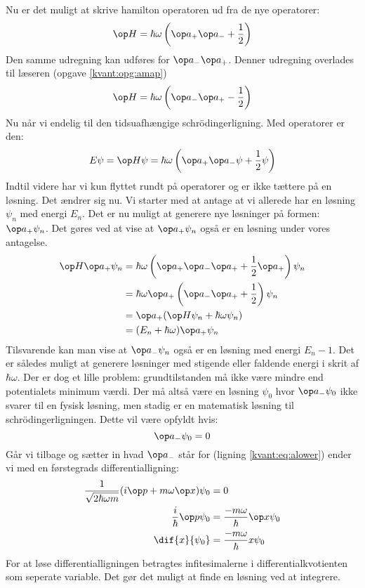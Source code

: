 Nu er det muligt at skrive hamilton operatoren ud fra de nye operatorer:
$$
\op H = \hbar \omega\left(\op a_+\op a_-+\frac{1}{2}\right)
$$
Den samme udregning kan udføres for $\op a_- \op a_+$. Denner udregning overlades til læseren (opgave \ref{kvant:opg:amap})
\begin{equation}
\op H = \hbar \omega\left(\op a_-\op a_+ -\frac{1}{2}\right)
\label{kvant:eq:Hamap}
\end{equation}
Nu når vi endelig til den tidsuafhængige schrödingerligning. Med operatorer er den:
$$
E\psi = \op H \psi = \hbar\omega \left(\op a_+\op a_-\psi+\frac{1}{2}\psi\right)
$$
Indtil videre har vi kun flyttet rundt på operatorer og er ikke tættere på en løsning. Det ændrer sig nu. Vi starter med at antage at vi allerede har en løsning $\psi_n$ med energi $E_n$. Det er nu muligt at generere nye løsninger på formen:$\op a_+\psi_n$. Det gøres ved at vise at $\op a_+\psi_n$ også er en løsning under vores antagelse.
\begin{align*}
\op H \op a_+ \psi_n &= \hbar\omega\left(\op a_+\op a_-\op a_++\frac{1}{2}\op a_+\right)\psi_n\\
&= \hbar\omega\op a_+\left(\op a_-\op a_+ +\frac{1}{2}\right)\psi_n\\
&=\op a_+(\op H\psi_n + \hbar\omega\psi_n)\\
&= (E_n+\hbar\omega)\op a_+ \psi_n
\end{align*}
Tilsvarende kan man vise at $\op a_-\psi_n$ også er en løsning med energi $E_n-1$. Det er således muligt at generere løsninger med stigende eller faldende energi  i skrit af $\hbar \omega$. Der er dog et lille problem: grundtilstanden må ikke være mindre end potentialets minimum værdi. Der må altså være en løsning $\psi_0$ hvor $\op a_-\psi_0$ ikke svarer til en fysisk løsning, men stadig er en matematisk løsning til schrödingerligningen. Dette vil være opfyldt hvis:
$$
\op a_-\psi_0  = 0
$$
Går vi tilbage og sætter in hvad $\op a_-$ står for (ligning \eqref{kvant:eq:alower}) ender vi med en førstegrads differentialligning:
\begin{align*}
\frac{1}{\sqrt{2\hbar\omega m}}(i\op p+m\omega \op x)\psi_0&=0\\
\frac{i}{\hbar}\op p\psi_0 &= \frac{-m\omega}{\hbar}\op x\psi_0\\
\dif{x}{\psi_0}&=\frac{-m\omega}{\hbar}x\psi_0
\end{align*}
For at løse differentialligningen betragtes infitesimalerne i differentialkvotienten som seperate variable. Det gør det muligt at finde en løsning ved at integrere.
